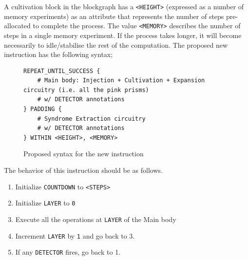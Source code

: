 \documentclass{article}
\begin{document}
	A cultivation block in the blockgraph has a {\tt <HEIGHT>} (expressed as a number of memory experiments) as an attribute that represents the number of steps pre-allocated to complete the process. The value {\tt <MEMORY>} describes the number of steps in a single memory experiment. If the process takes longer, it will become necessarily to idle/stabilise the rest of the computation. The proposed new instruction has the following syntax;
	
	\begin{figure}[h!]
		\centering
		\begin{BVerbatim}
REPEAT_UNTIL_SUCCESS {
    # Main body: Injection + Cultivation + Expansion circuitry (i.e. all the pink prisms)
    # w/ DETECTOR annotations
} PADDING {
    # Syndrome Extraction circuitry
    # w/ DETECTOR annotations
} WITHIN <HEIGHT>, <MEMORY>
		\end{BVerbatim}
		\caption{Proposed syntax for the new instruction}	
	\end{figure}

	The behavior of this instruction should be as follows.
	
	\begin{enumerate}
		\item Initialize {\tt COUNTDOWN} to {\tt <STEPS>}
		\item Initialize {\tt LAYER} to {\tt 0}
		\item Execute all the operations at {\tt LAYER} of the Main body
		\item Increment {\tt LAYER} by {\tt 1} and go back to 3.
		\item If any {\tt DETECTOR} fires, go back to 1.
	\end{enumerate}


\end{document}
